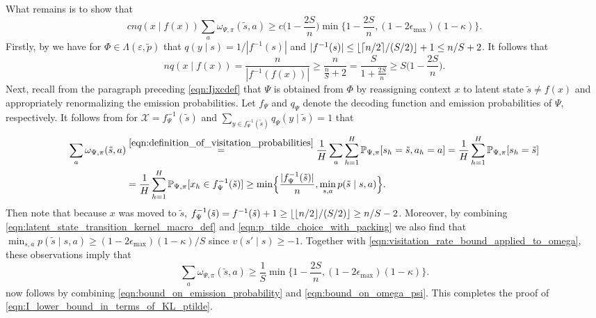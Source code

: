 \documentclass[11pt]{article}
\newcommand{\mcX}{\mathcal{X}}
\newcommand{\mbbP}{\mathbb{P}}
\DeclarePairedDelimiter\ceil{\lceil}{\rceil}
\DeclarePairedDelimiter\floor{\lfloor}{\rfloor}
\theoremstyle{definition}
\theoremstyle{definition}
\begin{document}
What remains is to show that
\begin{equation}
	cnq(x\mid f(x))\allowbreak\sum_a\omega_{\Psi,\pi}(\tilde{s},a)
	\geq
	c\biggl(1-\frac{2S}{n}\biggr)
	\min\biggl\{
	1-\frac{2S}{n},
	(1-2\epsilon_{\max})(1-\kappa)
	\biggr\}
	.
	\label{eqn:bound_on_visitation_rate}
\end{equation}
Firstly, by  we have for $\Phi\in\Lambda(\varepsilon,\tilde{p})$ that $q(y \mid s)=1/|f^{-1}(s)|$ and $|f^{-1}(s)|\leq \floor{\ceil{n/2}/(S/2)}+1\leq n/S + 2$.
It follows that
\begin{equation}
	\label{eqn:bound_on_emission_probability}
	nq(x\mid f(x))
	=
	\frac{n}{|f^{-1}(f(x))|}
	\geq
	\frac{n}{\frac{n}{S}+2}
	=
	\frac{S}{1+\frac{2S}{n}}
	\geq
	S\biggl(1-\frac{2S}{n}\biggr)
	.
\end{equation}
Next, recall from the paragraph preceding \eqref{eqn:Ijxcdef} that $\Psi$ is obtained from $\Phi$ by reassigning context $x$ to latent state $\tilde{s}\neq f(x)$ and appropriately renormalizing the emission probabilities.
Let $f_{\Psi}$ and $q_{\Psi}$ denote the decoding function and emission probabilities of $\Psi$, respectively.
It follows from  for $\mcX = f^{-1}_{\Psi}(\tilde{s})$ and $\sum_{y\in f^{-1}_{\Psi}(\tilde{s})}q_{\Psi}(y \mid \tilde{s})=1$ that
\begin{equation}
	\label{eqn:visitation_rate_bound_applied_to_omega}
	\begin{split}
		\sum_a
		\omega_{\Psi,\pi}(\tilde{s},a)
		 &
		\overset{\eqref{eqn:definition_of_visitation_probabilities}}{=}
		\frac{1}{H}
		\sum_a
		\sum_{h=1}^H
		\mbbP_{\Psi,\pi}[s_h=\tilde{s},a_h=a]
		=
		\frac{1}{H}
		\sum_{h=1}^H
		\mbbP_{\Psi,\pi}[s_h=\tilde{s}]
		\\
		 &
		=
		\frac{1}{H}
		\sum_{h=1}^H
		\mbbP_{\Psi,\pi}[x_h\in f_{\Psi}^{-1}(\tilde{s})]
		\geq
		\min
		\Bigl\{
		\frac{|f_{\Psi}^{-1}(\tilde{s})|}{n}
		,
		\min_{s,a}
		p(\tilde{s} \mid s,a)
		\Bigr\}
		.
	\end{split}
\end{equation}
Then note that because $x$ was moved to $\tilde{s}$, $f^{-1}_{\Psi}(\tilde{s})= f^{-1}(\tilde{s})+1 \geq \floor{\floor{n/2}/(S/2)} \geq n/S-2$.
Moreover, by combining \eqref{eqn:latent_state_transition_kernel_macro_def} and \eqref{eqn:p_tilde_choice_with_packing} we also find that $\min_{s,a}p(\tilde{s}\mid s,a)\geq (1-2\epsilon_{\max})(1-\kappa)/S$ since $v(s' \mid s)\geq -1$.
Together with \eqref{eqn:visitation_rate_bound_applied_to_omega}, these observations imply that
\begin{equation}
	\label{eqn:bound_on_omega_psi}
	\sum_a
	\omega_{\Psi,\pi}(\tilde{s},a)
	\geq
	\frac{1}{S}
	\min
	\biggl\{1-\frac{2S}{n},(1-2\epsilon_{\max})(1-\kappa)\biggr\}
	.
\end{equation}
 now follows by combining \eqref{eqn:bound_on_emission_probability} and \eqref{eqn:bound_on_omega_psi}.
This completes the proof of \eqref{eqn:I_lower_bound_in_terms_of_KL_ptilde}.
\end{document}
